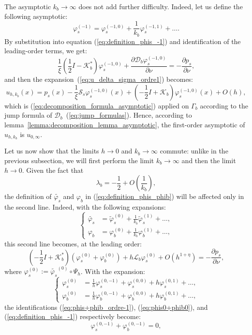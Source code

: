 The asymptotic $k_{b}\rightarrow\infty$ does not add further
difficulty. Indeed, let us define the following asymptotic:
\[
\varphi_{s}^{(-1)}=\varphi_{s}^{(-1,0)}+\frac{1}{k_{b}}\varphi_{s}^{(-1,1)}+\ldots.
\]
 By substitution into equation (\ref{eq:definition_phis_-1}) and
identification of the leading-order terms, we get:
\[
\frac{1}{\xi}\left(\frac{1}{2}I-\mathcal{K}_{b}^{*}\right)\varphi_{s}^{(-1,0)}+\frac{\partial\mathcal{D}_{b}\varphi_{s}^{(-1,0)}}{\partial\nu}=-\frac{\partial p_s}{\partial\nu},
\]
 and then the expansion~(\ref{eq:u_delta_sigma_ordre1}) becomes:
\begin{equation}
u_{h,k_{b}}(x)=p_s(x)-\frac{1}{\xi}\mathcal{S}_{s}\varphi_{s}^{(-1,0)}(x)+\left(-\frac{1}{2}I+\mathcal{K}_{b}\right)\varphi_{s}^{(-1,0)}(x)+O\left(h\right),\label{eq:DL_u_final}
\end{equation}
 which is (\ref{eq:decomposition_formula_asymptotic}) applied on
$\Gamma_{b}$ according to the jump formula of
$\mathcal{D}_{b}$~(\ref{eq:jump_formulas}). Hence, according to
lemma~\ref{lemma:decomposition_lemma_asymptotic}, the first-order
asymptotic of $u_{h,k_{b}}$ is $u_{0,\infty}$.

Let us now show that the limits $h\rightarrow0$ and
$k_{b}\rightarrow\infty$ commute: unlike in the previous
subsection, we will first perform the limit
$k_{b}\rightarrow\infty$ and then the limit $h\rightarrow0$.
Given the fact that
\[
\lambda_{b}=-\frac{1}{2}+O\left(\frac{1}{k_{b}}\right),
\]
 the definition of $\tilde{\varphi_{s}}$ and $\varphi_{b}$ in (\ref{eq:definition_phis_phib})
will be affected only in the second line. Indeed, with the following
expansions:
\[
\left\{ \begin{alignedat}{1}\tilde{\varphi_{s}} & =\tilde{\varphi}_{s}^{(0)}+\frac{1}{k_{b}}\tilde{\varphi}_{s}^{(1)}+\ldots,\\
\varphi_{b} & =\varphi_{b}^{(0)}+\frac{1}{k_{b}}\varphi_{b}^{(1)}+\ldots,
\end{alignedat}
\right.
\]
 this second line becomes, at the leading order:
\[
\left(-\frac{1}{2}I+\mathcal{K}_{b}^{*}\right)(\varphi_{s}^{(0)}+\varphi_{b}^{(0)})+h\mathcal{L}_{b}\varphi_{s}^{(0)}+O(h^{1+\eta})=-\frac{\partial p_s}{\partial\nu},
\]
 where $\varphi_{s}^{(0)}:=\tilde{\varphi_{s}}^{(0)}\circ\Psi_{h}$.
With the expansion:
\[
\left\{ \begin{alignedat}{1}\varphi_{s}^{(0)} & =\frac{1}{h}\varphi_{s}^{(0,-1)}+\varphi_{s}^{(0,0)}+h\varphi_{s}^{(0,1)}+\ldots,\\
\varphi_{b}^{(0)} & =\frac{1}{h}\varphi_{b}^{(0,-1)}+\varphi_{b}^{(0,0)}+h\varphi_{b}^{(0,1)}+\ldots,
\end{alignedat}
\right.
\]
 the identifications (\ref{eq:phis+phib_ordre-1}), (\ref{eq:phis0+phib0}),
and (\ref{eq:definition_phis_-1}) respectively become:
\begin{equation}
\varphi_{s}^{(0,-1)}+\varphi_{b}^{(0,-1)}=0,\label{eq:phis+phib_ordre-1(bis)}
\end{equation}

